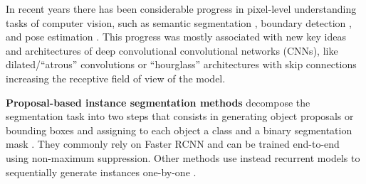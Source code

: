 
In recent years there has been considerable progress in pixel-level understanding tasks of computer vision, such as semantic segmentation \cite{long2015fully,kong2018recurrent,chen2018deeplab}, boundary detection \cite{arbelaez2011contour,xie2015holistically,maninis2018convolutional}, %
and pose estimation \cite{wei2016convolutional,cao2017realtime}. This progress was mostly associated with new key ideas and architectures of deep convolutional convolutional networks (CNNs), like dilated/``atrous'' convolutions \cite{yu2015multi,chen2018deeplab} or ``hourglass'' architectures with skip connections \cite{ronneberger2015u,paszke2016enet} increasing the receptive field of view of the model.

\textbf{Proposal-based instance segmentation methods} decompose the segmentation task into two steps that consists in generating object proposals or bounding boxes and assigning to each object a class and a binary segmentation mask \cite{he2017mask,yang2012layered,li2017fully,ladicky2010and,hariharan2014simultaneous,chen2015multi,dai2016instance,liang2016reversible}. 
They commonly rely on Faster RCNN \cite{ren2015faster} and can be trained end-to-end using non-maximum suppression. Other methods use instead recurrent models to sequentially generate instances one-by-one \cite{romera2016recurrent,ren2017end}.


